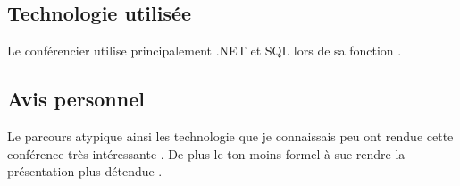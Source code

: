  	\subsection{Technologie utilisée}
 	Le conférencier utilise principalement .NET et SQL lors de sa fonction .
 	\subsection{Avis personnel} 
 	Le parcours atypique ainsi les technologie que je connaissais peu ont rendue cette conférence très intéressante . De plus le ton moins formel à sue rendre la présentation plus détendue .